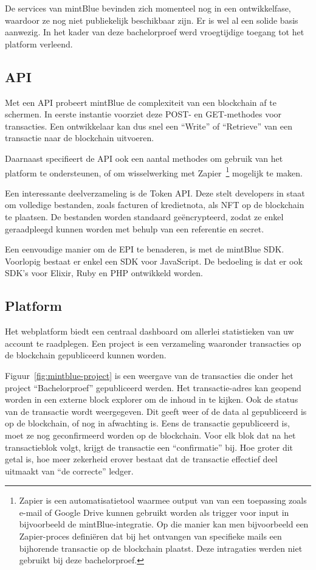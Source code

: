 De services van mintBlue bevinden zich momenteel nog in een ontwikkelfase, waardoor ze nog niet publiekelijk beschikbaar zijn. Er is wel al een solide basis aanwezig. In het kader van deze bachelorproef werd vroegtijdige toegang tot het platform verleend.

\subsection{API}
\label{sub:api}

Met een API probeert mintBlue de complexiteit van een blockchain af te schermen. In eerste instantie voorziet deze POST- en GET-methodes voor transacties. Een ontwikkelaar kan dus snel een ``Write'' of ``Retrieve'' van een transactie naar de blockchain uitvoeren.

Daarnaast specifieert de API ook een aantal methodes om gebruik van het platform te ondersteunen, of om wisselwerking met Zapier~\footnote{Zapier is een automatisatietool waarmee output van van een toepassing zoals e-mail of Google Drive kunnen gebruikt worden als trigger voor input in bijvoorbeeld de mintBlue-integratie. Op die manier kan men bijvoorbeeld een Zapier-proces definiëren dat bij het ontvangen van specifieke mails een bijhorende transactie op de blockchain plaatst. Deze intragaties werden niet gebruikt bij deze bachelorproef.} mogelijk te maken.

Een interessante deelverzameling is de Token API. Deze stelt developers in staat om volledige bestanden, zoals facturen of kredietnota, als NFT op de blockchain te plaatsen. De bestanden worden standaard geëncrypteerd, zodat ze enkel geraadpleegd kunnen worden met behulp van een referentie en secret.

Een eenvoudige manier om de EPI te benaderen, is met de mintBlue SDK. Voorlopig bestaat er enkel een SDK voor JavaScript. De bedoeling is dat er ook SDK's voor Elixir, Ruby en PHP ontwikkeld worden.

\subsection{Platform}
\label{sub:platform}

Het webplatform biedt een centraal dashboard om allerlei statistieken van uw account te raadplegen. Een project is een verzameling waaronder transacties op de blockchain gepubliceerd kunnen worden.

Figuur~\ref{fig:mintblue-project} is een weergave van de transacties die onder het project ``Bachelorproef'' gepubliceerd werden. Het transactie-adres kan geopend worden in een externe block explorer om de inhoud in te kijken.
Ook de status van de transactie  wordt weergegeven. Dit geeft weer of de data al gepubliceerd is op de blockchain, of nog in afwachting is. Eens de transactie gepubliceerd is, moet ze nog geconfirmeerd worden op de blockchain. Voor elk blok dat na het transactieblok volgt, krijgt de transactie een ``confirmatie'' bij. Hoe groter dit getal is, hoe meer zekerheid erover bestaat dat de transactie effectief deel uitmaakt van ``de correcte'' ledger.

